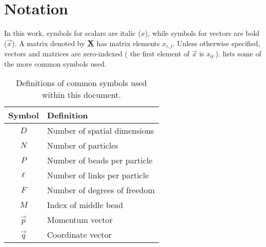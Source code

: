 \chapter{Notation}

In this work, symbols for scalars are italic ($x$), while symbols for vectors are bold ($\vec{x}$).
A matrix denoted by $\underline{\bm{\mathbf{X}}}$ has matrix elements $x_{i,j}$.
Unless otherwise specified, vectors and matrices are zero-indexed (\ie{} the first element of $\vec{x}$ is $x_0$.).
 lists some of the more common symbols used.

\begin{table}[h]
	\renewcommand*\arraystretch{1.2}
	\begin{center}
	\begin{tabular}{ c l }
		\toprule
		Symbol & Definition \\
		\midrule
		$D$ & Number of spatial dimensions \\
		$N$ & Number of particles \\
		$P$ & Number of beads per particle \\
		$\ell$ & Number of links per particle \\
		$F$ & Number of degrees of freedom \\
		$M$ & Index of middle bead \\
		$\vec{p}$ & Momentum vector \\
		$\vec{q}$ & Coordinate vector \\
		\bottomrule
	\end{tabular}
	\end{center}
	\caption[
		Definitions of common symbols
	]{
		Definitions of common symbols used within this document.
	}
	\label{tab:symbols}
\end{table}

